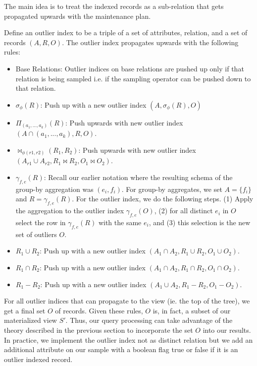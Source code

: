 The main idea is to treat the indexed records as a sub-relation that gets propagated upwards with the maintenance plan.
\begin{definition}
Define an outlier index to be a triple of a set of attributes, relation, and a set of records $(A,R,O)$. The outlier index propagates upwards with the following rules:
\begin{itemize}\vspace{-.45em}
\item Base Relations: Outlier indices on base relations are pushed up only if that relation is being sampled i.e. if the sampling operator can be pushed down to that relation.\vspace{-.45em}
\item $\sigma_{\phi}(R)$: Push up with a new outlier index $(A,\sigma_{\phi}(R),O)$ \vspace{-.45em}
\item $\Pi_{(a_1,...,a_k)}(R)$: Push upwards with new outlier index $(A \cap (a_1,...,a_k), R,O)$.\vspace{-.45em}
\item $\bowtie_{\phi (r1,r2)}(R_1,R_2)$: Push upwards with new outlier index $(A_{r1} \cup A_{r2}, R_1 \bowtie R_2 ,O_1 \bowtie O_2)$.
\item $\gamma_{f,e}(R)$: Recall our earlier notation where the resulting schema of the group-by aggregation was $(e_i,f_i)$. For group-by aggregates, we set $A = \{f_i\}$ and $R = \gamma_{f,e}(R)$. For the outlier index, we do the following steps. (1) Apply the aggregation to the outlier index $\gamma_{f,e}(O)$, (2) for all distinct $e_i$ in $O$ select the row in $\gamma_{f,e}(R)$ with the same $e_i$, and (3) this selection is the new set of outliers $O$. 
\item $R_1 \cup R_2$: Push up with a new outlier index $(A_1 \cap A_2 ,R_1 \cup R_2,O_1 \cup O_2)$. 
\item $R_1 \cap R_2$: Push up with a new outlier index $(A_1 \cap A_2 ,R_1 \cap R_2,O_1 \cap O_2)$.
\item $R_1 - R_2$: Push up with a new outlier index $(A_1 \cup A_2 ,R_1 - R_2,O_1 - O_2)$.
\end{itemize}
\end{definition}

For all outlier indices that can propagate to the view (ie. the top of the tree), we get a final set $O$ of records. 
Given these rules, $O$ is, in fact, a subset of our materialized view $S'$.
Thus, our query processing can take advantage of the theory described in the previous section to incorporate the set $O$ into our results.
In practice, we implement the outlier index not as distinct relation but we add an additional attribute on our sample with a boolean flag true or false if it is an outlier indexed record.

